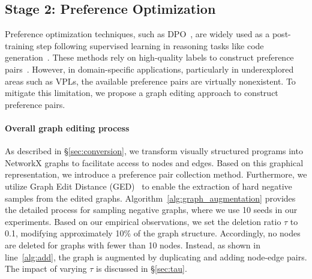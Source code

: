 \subsection{Stage 2: Preference Optimization}
Preference optimization techniques, such as DPO~\citep{rafailov2023direct}, are widely used as a post-training step following supervised learning in reasoning tasks like code generation~\cite{hui2024qwen25codertechnicalreport, 10.5555/3600270.3601819, weyssow2024codeultrafeedbackllmasajudgedatasetaligning}. These methods rely on high-quality labels to construct preference pairs~\citep{pace2024westofnsyntheticpreferencesselfimproving}. However, in domain-specific applications, particularly in underexplored areas such as VPLs, the available preference pairs are virtually nonexistent. To mitigate this limitation, we propose a graph editing approach to construct preference pairs.


\paragraph{Overall graph editing process}
As described in \S\ref{sec:conversion}, we transform visually structured programs into NetworkX graphs to facilitate access to nodes and edges. Based on this graphical representation, we introduce a preference pair collection method. Furthermore, we utilize Graph Edit Distance (GED)~\cite{6313167, abu2015exact} to enable the extraction of hard negative samples from the edited graphs. Algorithm~\ref{alg:graph_augmentation} provides the detailed process for sampling negative graphs, where we use 10 seeds in our experiments. Based on our empirical observations, we set the deletion ratio $\tau$ to 0.1, modifying approximately 10\% of the graph structure. Accordingly, no nodes are deleted for graphs with fewer than 10 nodes. Instead, as shown in line~\ref{alg:add}, the graph is augmented by duplicating and adding node-edge pairs. The impact of varying $\tau$ is discussed in \S\ref{sec:tau}.

